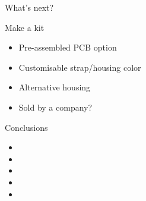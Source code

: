 \documentclass[compress,red]{beamer}
\begin{document}
\begin{frame}{What's next?}

  \begin{block}{Make a kit}
    \begin{itemize}
    \item Pre-assembled PCB option
    \item Customisable strap/housing color
    \item Alternative housing
    \item Sold by a company?
    \end{itemize}
  \end{block}

  \note[item]{}

\end{frame}



\begin{frame}{Conclusions}

  \begin{block}{}
    \begin{itemize}
    \item 
    \item 
    \item 
    \item 
    \item 
    \end{itemize}
  \end{block}

  \note[item]{}

\end{frame}


\begin{comment}
\end{comment}
\end{document}
